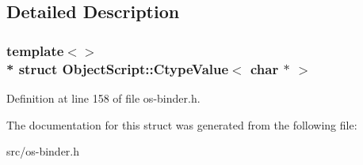 \subsection{Detailed Description}
\subsubsection*{template$<$$>$\\*
struct Object\+Script\+::\+Ctype\+Value$<$ char $\ast$ $>$}



Definition at line 158 of file os-\/binder.\+h.



The documentation for this struct was generated from the following file\+:\begin{DoxyCompactItemize}
\item 
src/os-\/binder.\+h\end{DoxyCompactItemize}
